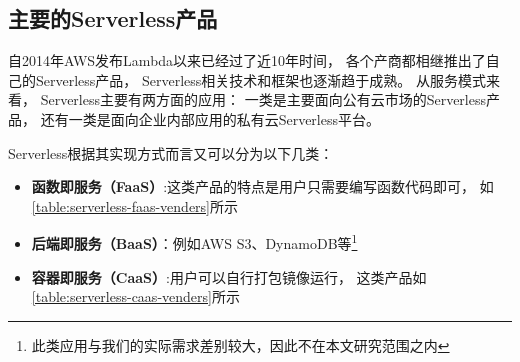 \subsection{主要的Serverless产品}

自2014年AWS发布Lambda\cite{introducing_lambda}以来已经过了近10年时间，
各个产商都相继推出了自己的Serverless产品，
Serverless相关技术和框架也逐渐趋于成熟。
从服务模式来看，
Serverless主要有两方面的应用：
一类是主要面向公有云市场的Serverless产品，
还有一类是面向企业内部应用的私有云Serverless平台。

Serverless根据其实现方式而言又可以分为以下几类\cite{cloud_native_report_serverless}：

\begin{itemize}
    \item \textbf{函数即服务（FaaS）}:这类产品的特点是用户只需要编写函数代码即可，
    如\cref{table:serverless-faas-venders}所示
    \item \textbf{后端即服务（BaaS）}：例如AWS S3、DynamoDB等\cite{meituan_serverless_nest}\footnote{此类应用与我们的实际需求差别较大，因此不在本文研究范围之内}
    \item \textbf{容器即服务（CaaS）}:用户可以自行打包镜像运行，
    这类产品如\cref{table:serverless-caas-venders}所示
\end{itemize}

